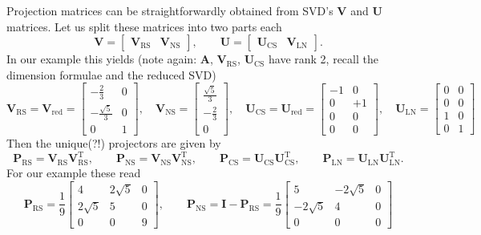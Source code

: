 \documentclass[a4paper, 11pt]{scrartcl}
\begin{document}
Projection matrices can be straightforwardly obtained from SVD's $\bm{V}$ and $\bm{U}$ matrices.
Let us split these matrices into two parts each
$$
\bm{V} =
\begin{bmatrix}
\bm{V}_\text{RS} & \bm{V}_\text{NS}
\end{bmatrix},\qquad
\bm{U} =
\begin{bmatrix}
\bm{U}_\text{CS} & \bm{V}_\text{LN}
\end{bmatrix}.
$$
In our example this yields (note again: $\bm{A}$, $\bm{V}_\text{RS}$, $\bm{U}_\text{CS}$ have rank 2, recall the dimension formulae and the reduced SVD)
$$
\bm{V}_\text{RS}=
\bm{V}_\text{red}=
\begin{bmatrix}
-\frac{2}{3} & 0\\
-\frac{\sqrt{5}}{3} & 0\\
0 & 1
\end{bmatrix},\quad
\bm{V}_\text{NS}=
\begin{bmatrix}
\frac{\sqrt{5}}{3}\\
-\frac{2}{3}\\
0
\end{bmatrix},\quad
\bm{U}_\text{CS}
=
\bm{U}_\text{red}
=
\begin{bmatrix}
-1 & 0\\
0 & +1\\
0 & 0\\
0 & 0
\end{bmatrix},\quad
\bm{U}_\text{LN} =
\begin{bmatrix}
0 & 0\\
0 & 0\\
1 & 0\\
0 & 1
\end{bmatrix}
$$
Then the unique(?!) projectors are given by
$$
\bm{P}_\text{RS} = \bm{V}_\text{RS} \bm{V}_\text{RS}^\mathrm{T}, \qquad
\bm{P}_\text{NS} = \bm{V}_\text{NS} \bm{V}_\text{NS}^\mathrm{T}, \qquad
\bm{P}_\text{CS} = \bm{U}_\text{CS} \bm{U}_\text{CS}^\mathrm{T}, \qquad
\bm{P}_\text{LN} = \bm{U}_\text{LN} \bm{U}_\text{LN}^\mathrm{T}.
$$
For our example these read
$$
\bm{P}_\text{RS}
=
\frac{1}{9}
\begin{bmatrix}
4 & 2 \sqrt{5} & 0\\
2 \sqrt{5} & 5 & 0\\
0 & 0 & 9
\end{bmatrix},\qquad
\bm{P}_\text{NS} =
\bm{I} - \bm{P}_\text{RS} =
\frac{1}{9}
\begin{bmatrix}
5 & -2\sqrt{5} & 0\\
-2\sqrt{5} & 4 & 0\\
0 & 0 & 0
\end{bmatrix}
$$
\end{document}
